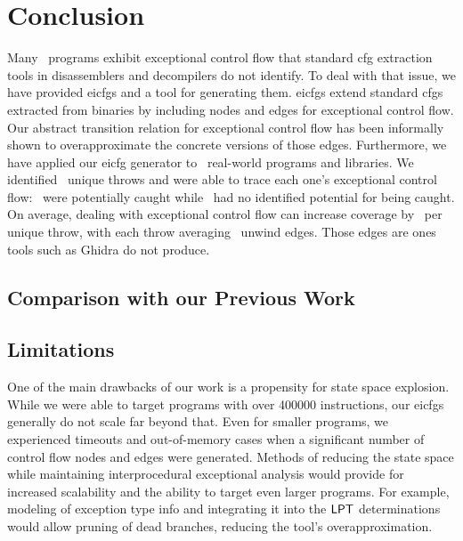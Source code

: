 \chapter{Conclusion}\label{eicfg-conclusion}
Many \Cpp\ programs exhibit exceptional control flow that standard \ac{cfg} extraction tools in disassemblers and decompilers do not identify.
To deal with that issue, we have provided \acp{eicfg} and a tool for generating them.
\acp{eicfg} extend standard \acp{cfg} extracted from binaries by including nodes and edges for exceptional control flow.
Our abstract transition relation for exceptional control flow has been informally shown to overapproximate the concrete versions of those edges.
Furthermore, we have applied our \ac{eicfg} generator to \totalbins\ real-world programs and libraries.
We identified \uniquethrows\ unique throws and were able to trace each one's exceptional control flow: \caughtthrows\ were potentially caught while \uncaughtthrows\ had no identified potential for being caught.
On average, dealing with exceptional control flow can increase coverage by \avgdiffinst\ per unique throw, with each throw averaging \avgunwinds\ unwind edges.
Those edges are ones tools such as Ghidra do not produce.

\section{Comparison with our Previous Work}

\section{Limitations}
One of the main drawbacks of our work is a propensity for state space explosion.
While we were able to target programs with over \num{400000} instructions,
our \acp{eicfg} generally do not scale far beyond that. Even for smaller programs, we experienced timeouts and out-of-memory cases when a significant number of control flow nodes and edges were generated.
Methods of reducing the state space while maintaining interprocedural exceptional analysis would provide for increased scalability and the ability to target even larger programs.
For example, modeling of exception type info and integrating it into the $\operatorname{\mathsf{LPT}}$ determinations would allow pruning of dead branches, reducing the tool's overapproximation.

